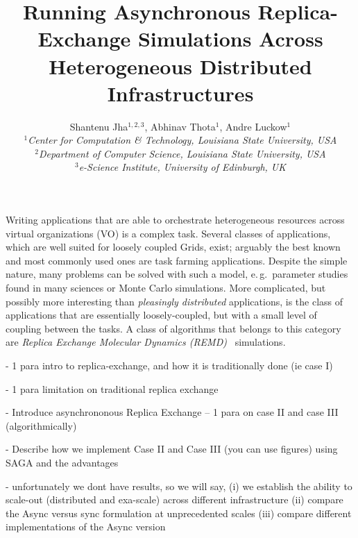 \documentclass[a4paper,10pt]{article}
\begin{document}
\title{\LARGE Running Asynchronous Replica-Exchange Simulations Across Heterogeneous Distributed Infrastructures}
 
\author{Shantenu Jha$^{1,2,3}$, Abhinav Thota$^{1}$, Andre Luckow$^{1}$ \\
   \small{\emph{$^{1}$Center for Computation \& Technology, Louisiana State University, USA}}\\
   \small{\emph{$^{2}$Department of Computer Science, Louisiana State University, USA}}\\
   \small{\emph{$^{3}$e-Science Institute, University of Edinburgh, UK}}
   }
 
\maketitle
 
Writing applications that are able to orchestrate heterogeneous
resources across virtual organizations (VO) is a complex task.  Several 
classes of applications, which are well suited for loosely
coupled Grids, exist; arguably the best known and most commonly used ones are
task farming applications. Despite the simple nature, many problems
can be solved with such a model, e.\,g.\ parameter studies found in
many sciences or Monte Carlo simulations. More complicated, but possibly more 
interesting than {\it pleasingly  distributed} applications, is the class of applications that are
essentially loosely-coupled, but with a small level of coupling
between the tasks.  A class of algorithms that belongs to this category are
\emph{Replica Exchange Molecular Dynamics (REMD)}~\cite{hansmann,Sugita:1999rm} simulations. 
 
 
- 1 para intro to replica-exchange, and how it is traditionally done (ie case I)
 
- 1 para limitation on traditional replica exchange

- Introduce asynchrononous Replica Exchange --  1 para on case II and case
III (algorithmically)

- Describe how we implement Case II and Case III (you can use figures)
  using SAGA and the advantages
  
- unfortunately we dont have results, so we will say, (i) we establish the
 ability to scale-out (distributed and exa-scale)  across different
 infrastructure (ii) compare the Async versus sync formulation at
 unprecedented scales (iii) compare different implementations  of
 the Async version
 
 
  
 
\end{document}
